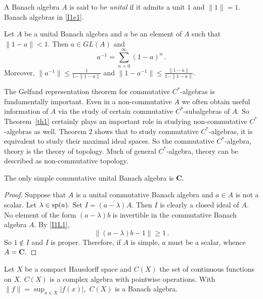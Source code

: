 \documentclass{ws-rv9x6}
\begin{document}
\begin{definition}\label{I1Da1}
A Banach algebra $A$ is said to be {\it
unital} if it admits a unit $1$ and
$\|1\|=1.$ Banach algebras in \ref{I1e1}.
\end{definition}

\begin{lemma}\label{I1L1}
Let $A$ be a unital Banach algebra and $a$ be an element
of $A$ such that $\|1-a\|<1.$ Then $a\in GL(A)$ and 
\[
a^{-1}=\sum_{n=0}^{\infty}(1-a)^n\,.
\]
Moreover, $\|a^{-1}\| \le \frac{1}{1-\|1-a\|}$ 
and $\|1-a^{-1}\|\le \frac{\|1-a\|}{1-\|1-a\|}.$
\end{lemma}

\begin{remark}\label{I2RC}
{\rm The Gelfand representation theorem for commutative $C^*$-algebras
is fundamentally important. Even in a non-commutative $A$ we often
obtain useful information of $A$ via the study of certain commutative
$C^*$-subalgebras of $A$. So Theorem~\ref{th1} certainly plays an important role
in studying non-commutative $C^*$-algebras as well.  Theorem 2 shows
that to study commutative $C^*$-algebras, it is equivalent to study
their maximal ideal spaces.  So the commutative $C^*$-algebra, theory
is the theory of topology. Much of general $C^*$-algebra, theory can
be described as non-commutative topology.}
\end{remark}

\begin{corollary}\label{I1C1}
The only simple commutative unital Banach algebra is ${\bf C}.$
\end{corollary}

\begin{proof}
Suppose that $A$ is a unital commutative Banach algebra and 
$a\in A$ is not a scalar. Let $\lambda\in {\rm sp}(a).$
Set $I={\overline{(a-\lambda)A}}.$ Then $I$ is clearly
a closed ideal of $A.$ No element of the form 
$(a-\lambda)b$ is invertible in the commutative Banach algebra
$A.$ By \ref{I1L1}, 
\[
\|(a-\lambda)b-1\|\ge 1\,.
\]
So $1\not\in I$ and $I$ is proper. Therefore, if $A$ is simple, 
$a$ must be a scalar, whence $A={\bf C}.$
\end{proof}

\begin{example}
Let $X$ be a compact Hausdorff space and 
$C(X)$ the set of continuous functions on $X.$
$C(X)$ is a complex algebra with pointwise operations.
With $\|f\|=\sup_{x\in X}|f(x)|,$ $C(X)$ is a 
Banach algebra.
\end{example}
\end{document}
